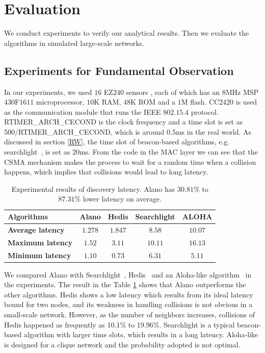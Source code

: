 \section{Evaluation}
\label{Evaluation}

We conduct experiments to verify our analytical results.
Then we evaluate the algorithms in simulated large-scale networks.

\subsection{Experiments for Fundamental Observation}

In our experiments, we used $16$ EZ$240$ sensors \cite{huang2012easipled}, 
each of which has an $8$MHz MSP$430$F$1611$ 
microprocessor, $10$K RAM, 
$48$K ROM and a $1$M flash. CC$2420$ is used as the communication 
module that runs the IEEE $802.15.4$ protocol.
RTIMER\_ARCH\_CECOND is the clock frequency 
and a time slot is set as 500/RTIMER\_ARCH\_CECOND,
which is around $0.5$ms in the real world. As discussed in section \ref{RW}, the time slot of beacon-based 
algorithms, e.g. searchlight~\cite{bakht2012searchlight}, is set as $20$ms.
From the code in the MAC layer we can see that the CSMA mechanism makes
the process to wait for a random time
when a collision happens, which implies that collisions would lead to
long latency.

\begin{table}[htbp]
\caption{Experimental results of discovery latency. Alano has $30.81\%$ to $ 87.31\%$ lower latency on average.}
\centering
\begin{tabular}{|l|c|c|c|c|} 
\hline
\textbf{Algorithms} & \textbf{Alano} & \textbf{Hedis} & \textbf{Searchlight} & \textbf{ALOHA} \\
\hline
\textbf{Average latency} & \textbf{$1.278$} & \textbf{$1.847$} & \textbf{$8.58$} & \textbf{$10.07$} \\
\hline
\textbf{Maximum latency} & \textbf{$1.52$} & \textbf{$3.11$} & \textbf{$10.11$} & \textbf{$16.13$} \\
\hline
\textbf{Minimum latency} & \textbf{$1.10$} & \textbf{$0.73$} & \textbf{$6.31$} & \textbf{$5.11$} \\
\hline
\end{tabular}
\label{Exp}
\end{table}

We compared Alano with Searchlight~\cite{bakht2012searchlight}, Hedis~\cite{chen2015heterogeneous}
and an Aloha-like algorithm~\cite{you2011aloha} in the experiments. The
result in the Table \ref{Exp} shows that Alano outperforms the other
algorithms.
Hedis shows a low latency which results from its ideal latency bound
for two nodes,
and its weakness in handling collisions is not obvious in a small-scale network. 
However, as the number of neighbors increases, collisions of Hedis \cite{chen2015heterogeneous} happened as frequently as 10.1\% to 19.96\%.
Searchlight is a typical beacon-based algorithm with larger time slots,
which results in a long latency.
Aloha-like is designed for a clique network and the probability adopted is not optimal.



